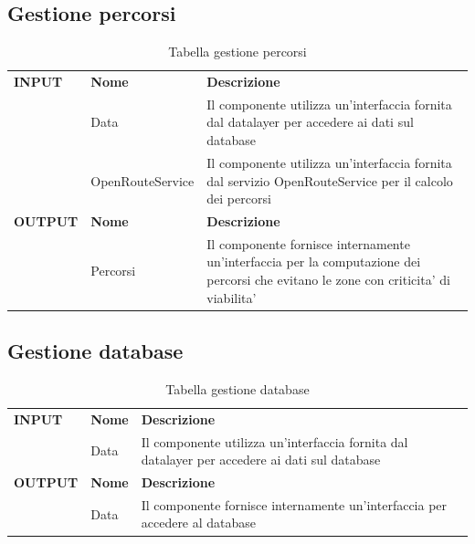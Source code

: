 \documentclass{article}
\begin{document}
\subsection{Gestione percorsi}

\begin{table}[htbp]
    \centering
    \renewcommand{\arraystretch}{1.3} %
    \begin{tabularx}{\textwidth}{| l | l | X |}
        \Xhline{2pt}
        \textbf{INPUT} & \textbf{Nome} & \textbf{Descrizione} \\
        \Xhline{2pt}
         & Data & Il componente utilizza un'interfaccia fornita dal datalayer per accedere ai dati sul database  \\
        \hline
         & OpenRouteService & Il componente utilizza un'interfaccia fornita dal servizio OpenRouteService per il calcolo dei percorsi \\
         \Xhline{2pt}
        \textbf{OUTPUT} & \textbf{Nome} & \textbf{Descrizione} \\
        \Xhline{2pt}
         & Percorsi & Il componente fornisce internamente un'interfaccia per la computazione dei percorsi che evitano le zone con criticita' di viabilita' \\
        \hline
    \end{tabularx}
    \caption{Tabella gestione percorsi}
\end{table}

\subsection{Gestione database}

\begin{table}[htbp]
    \centering
    \renewcommand{\arraystretch}{1.3} %
    \begin{tabularx}{\textwidth}{| l | l | X |}
        \Xhline{2pt}
        \textbf{INPUT} & \textbf{Nome} & \textbf{Descrizione} \\
        \Xhline{2pt}
         & Data & Il componente utilizza un’interfaccia fornita dal datalayer per accedere ai dati sul database \\
        \Xhline{2pt}
        \textbf{OUTPUT} & \textbf{Nome} & \textbf{Descrizione} \\
        \Xhline{2pt}
         & Data & Il componente fornisce internamente un’interfaccia per accedere al database \\
        \hline
    \end{tabularx}
    \caption{Tabella gestione database}
\end{table}
\end{document}
